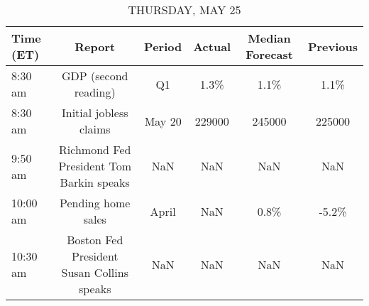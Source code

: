 \documentclass{article}%
\begin{document}
%


\begin{table}[htbp]%
\caption{THURSDAY, MAY 25}%
\centering%
\begin{adjustbox}{width=1\textwidth}%
\begin{tabular}{lccccc}
\toprule
Time (ET) &                                    Report & Period & Actual & Median Forecast & Previous \\
\midrule
  8:30 am &                      GDP (second reading) &     Q1 &   1.3\% &            1.1\% &     1.1\% \\
  8:30 am &                    Initial jobless claims & May 20 & 229000 &          245000 &   225000 \\
  9:50 am &  Richmond Fed President Tom Barkin speaks &    NaN &    NaN &             NaN &      NaN \\
 10:00 am &                        Pending home sales &  April &    NaN &            0.8\% &    -5.2\% \\
 10:30 am & Boston Fed President Susan Collins speaks &    NaN &    NaN &             NaN &      NaN \\
\bottomrule
\end{tabular}
%
\end{adjustbox}%
\end{table}

%
\end{document}
